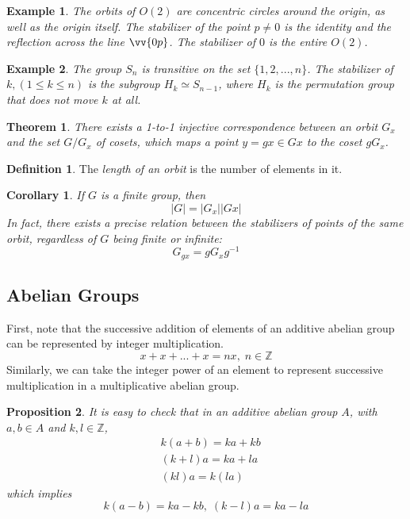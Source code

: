 \documentclass{article}
\newtheorem{theorem}{Theorem}[section]
\newtheorem{proposition}[theorem]{Proposition}
\newtheorem{example}{Example}[section]
\newtheorem{corollary}{Corollary}[theorem]
\theoremstyle{remark}
\theoremstyle{definition}
\newtheorem{definition}{Definition}[section]
\begin{document}
\begin{example}
The orbits of $O(2)$ are concentric circles around the origin, as well as the origin itself. The stabilizer of the point $p \neq 0$ is the identity and the reflection across the line $\vv{0p}$. The stabilizer of $0$ is the entire $O(2)$.
\end{example}

\begin{example}
The group $S_n$ is transitive on the set $\{1, 2, ..., n\}$. The stabilizer of $k, (1 \leq k \leq n)$ is the subgroup $H_{k} \simeq S_{n-1}$, where $H_k$ is the permutation group that does not move $k$ at all. 
\end{example}

\begin{theorem}
There exists a 1-to-1 injective correspondence between an orbit $G_x$ and the set $G / G_{x}$ of cosets, which maps a point $y = g x \in G x $ to the coset $g G_x$. 
\end{theorem}

\begin{definition}
The \textit{length of an orbit} is the number of elements in it. 
\end{definition}

\begin{corollary}
If $G$ is a finite group, then 
\[ |G| = |G_x| |G x| \]
In fact, there exists a precise relation between the stabilizers of points of the same orbit, regardless of $G$ being finite or infinite: 
\[ G_{g x} = g G_{x} g^{-1} \]
\end{corollary}

\subsection{Abelian Groups}
First, note that the successive addition of elements of an additive abelian group can be represented by integer multiplication. 
\[ x + x + ... + x = n x, \; n \in \mathbb{Z}\]
Similarly, we can take the integer power of an element to represent successive multiplication in a multiplicative abelian group. 

\begin{proposition}
It is easy to check that in an additive abelian group $A$, with $a, b \in A$ and $k, l \in \mathbb{Z}$, 
\begin{align}
    & k (a + b) = k a + k b \\
    & (k + l) a = k a + l a \\
    & (k l) a = k (l a)
\end{align}
which implies
\begin{equation}
    k(a - b) = k a - k b, \; (k - l) a = k a - l a
\end{equation}
\end{proposition}
\end{document}
